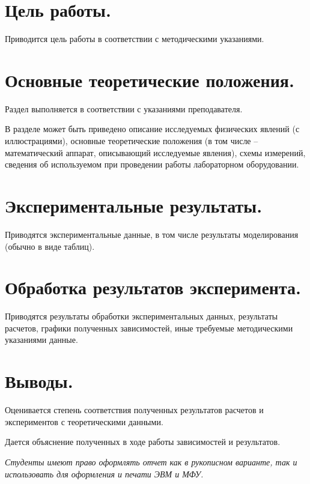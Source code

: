 \documentclass[14pt]{article}
\begin{document}
	
	\section*{Цель работы.}
	Приводится цель работы в соответствии с методическими указаниями.
	
	\section*{Основные теоретические положения.}
	Раздел выполняется в соответствии с указаниями преподавателя.
	
	В разделе может быть приведено описание исследуемых физических явлений (с иллюстрациями), основные теоретические положения (в том числе – математический аппарат, описывающий исследуемые явления), схемы измерений, сведения об используемом при проведении работы лабораторном оборудовании.
	
	\section*{Экспериментальные результаты.}
	Приводятся экспериментальные данные, в том числе результаты моделирования (обычно в виде таблиц).
	
	\section*{Обработка результатов эксперимента.}
	Приводятся результаты обработки экспериментальных данных, результаты расчетов, графики полученных зависимостей, иные требуемые методическими указаниями данные.
	
	\section*{Выводы.}
	Оценивается степень соответствия полученных результатов расчетов и экспериментов с теоретическими данными. 
	
	Дается объяснение полученных в ходе работы зависимостей и результатов. \newline

	\textit{Студенты имеют право оформлять отчет как в рукописном варианте, так и использовать для оформления и печати ЭВМ и МФУ.	}
	
\end{document}
